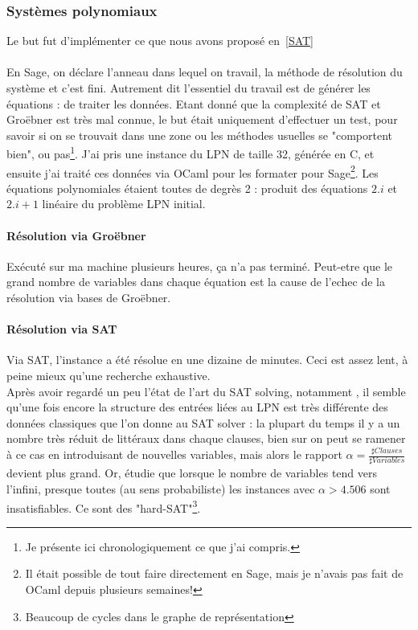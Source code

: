 \documentclass{article}		%
\theoremstyle{definition}
\theoremstyle{plain}
\begin{document}
\subsubsection{Systèmes polynomiaux}\label{ISAT}
Le but fut d'implémenter ce que nous avons proposé en~\ref{SAT}
\\\\
En Sage, on déclare l'anneau dans lequel on travail, la méthode de
résolution du système et c'est fini. Autrement dit l'essentiel du travail
est de générer les équations : de traiter les données. Etant donné que la
complexité de SAT et Groëbner est très mal connue, le but était
uniquement d'effectuer un test, pour savoir si on se trouvait dans une
zone ou les méthodes usuelles se "comportent bien", ou pas\footnote{Je
présente ici chronologiquement ce que j'ai compris.}.
J'ai pris une instance du LPN de taille 32, générée en C, et ensuite j'ai
traité ces données via OCaml pour les formater pour Sage\footnote{Il
était possible de tout faire directement en Sage, mais je n'avais pas
fait de OCaml depuis plusieurs semaines!}. Les équations polynomiales
étaient toutes de degrès 2 : produit des équations $2.i$ et $2.i+1$
linéaire du problème LPN initial.
\paragraph{Résolution via Groëbner}
Exécuté sur ma machine plusieurs heures, ça n'a pas terminé. Peut-etre 
que le grand nombre de variables dans chaque équation est la cause de
l'echec de la résolution via
bases de Groëbner.
\paragraph{Résolution via SAT}
Via SAT, l'instance a été résolue en une dizaine de minutes. Ceci est
assez lent, à peine mieux qu'une recherche exhaustive. 
\\
Après avoir regardé
un peu l'état de l'art du SAT solving, notamment \cite{Mezard}, il semble qu'une fois encore la
structure des entrées liées au LPN est très différente des données
classiques que l'on donne au SAT solver : la plupart du temps il y a un
nombre très réduit de littéraux dans chaque clauses, bien sur on peut se
ramener à ce cas en introduisant de nouvelles variables, mais alors le
rapport $\alpha=\frac {\sharp Clauses}{\sharp Variables}$ devient plus grand.
Or, \cite{Dubois} étudie que lorsque le nombre de variables tend vers
l'infini, presque toutes (au sens probabiliste) les
instances avec $\alpha > 4.506$ sont insatisfiables. Ce sont des
"hard-SAT"\footnote{Beaucoup de cycles dans le graphe de représentation}.
\end{document}
